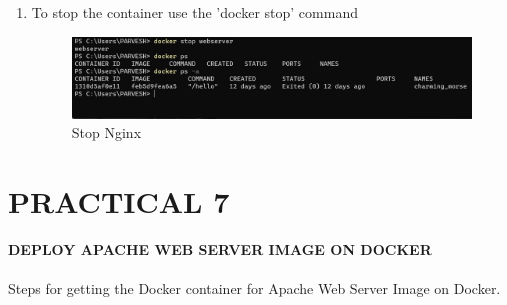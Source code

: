 \documentclass[12pt]{article}
\begin{document}
\begin{enumerate}
 \item To stop the container use the 'docker stop' command
 
\begin{figure}[H]
\centering
\includegraphics[scale=0.6]{fig20}
\caption{Stop Nginx}
\vspace{0.6\baselineskip}
\end{figure}	

 \end{enumerate}
 
 \clearpage


\section{PRACTICAL 7}

\textbf{\uppercase {Deploy Apache Web Server Image on Docker}} \\
\vspace{0.1\baselineskip} \\

Steps for getting the Docker container for Apache Web Server Image on Docker.
\end{document}
